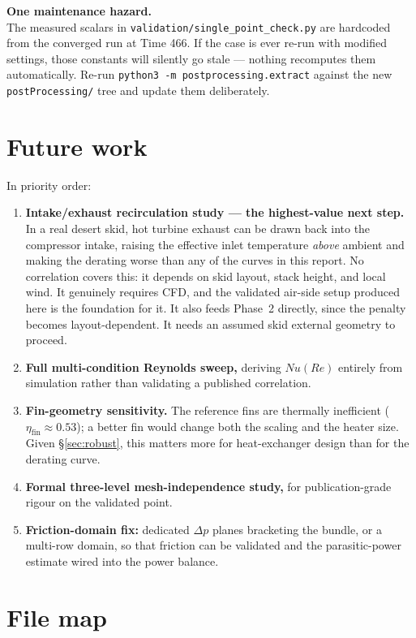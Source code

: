 \documentclass[11pt]{article}
\newcommand{\file}[1]{\texttt{\small #1}}
\newcommand{\warnbox}[2]{%
  \begin{center}\colorbox{warnbg}{\begin{minipage}{0.94\linewidth}\vspace{3pt}
  \textbf{#1}\\[2pt]#2\vspace{3pt}\end{minipage}}\end{center}}
\begin{document}
\warnbox{One maintenance hazard.}{The measured scalars in \file{validation/single\_point\_check.py} are
hardcoded from the converged run at Time 466. If the case is ever re-run with modified settings, those
constants will silently go stale --- nothing recomputes them automatically. Re-run
\file{python3 -m postprocessing.extract} against the new \file{postProcessing/} tree and update them
deliberately.}


\section{Future work}
\label{sec:future}

In priority order:

\begin{enumerate}[leftmargin=1.6em,itemsep=3pt]
\item \textbf{Intake/exhaust recirculation study --- the highest-value next step.} In a real desert skid, hot
turbine exhaust can be drawn back into the compressor intake, raising the effective inlet temperature
\emph{above} ambient and making the derating worse than any of the curves in this report. No correlation
covers this: it depends on skid layout, stack height, and local wind. It genuinely requires CFD, and the
validated air-side setup produced here is the foundation for it. It also feeds Phase~2 directly, since the
penalty becomes layout-dependent. It needs an assumed skid external geometry to proceed.
\item \textbf{Full multi-condition Reynolds sweep,} deriving $Nu(Re)$ entirely from simulation rather than
validating a published correlation.
\item \textbf{Fin-geometry sensitivity.} The reference fins are thermally inefficient
($\eta_\mathrm{fin}\approx0.53$); a better fin would change both the scaling and the heater size. Given
\S\ref{sec:robust}, this matters more for heat-exchanger design than for the derating curve.
\item \textbf{Formal three-level mesh-independence study,} for publication-grade rigour on the validated point.
\item \textbf{Friction-domain fix:} dedicated $\Delta p$ planes bracketing the bundle, or a multi-row domain,
so that friction can be validated and the parasitic-power estimate wired into the power balance.
\end{enumerate}


\appendix
\section{File map}
\end{document}

